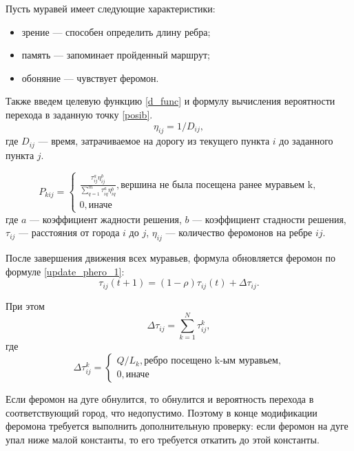 Пусть муравей имеет следующие характеристики:
\begin{itemize}[label=---]
	\item зрение --- способен определить длину ребра;
	\item память --- запоминает пройденный маршрут;
	\item обоняние --- чувствует феромон.
\end{itemize}

Также введем целевую функцию \eqref{d_func} и формулу вычисления вероятности перехода в заданную точку \eqref{posib}.
\begin{equation}
	\label{d_func}
	\eta_{ij} = 1 / D_{ij},
\end{equation}
где $D_{ij}$ — время, затрачиваемое на дорогу из текущего пункта $i$ до заданного пункта $j$.

\begin{equation}
	\label{posib}
	P_{kij} = \begin{cases}
		\frac{\tau_{ij}^a\eta_{ij}^b}{\sum_{q=1}^m \tau^a_{iq}\eta^b_{iq}}, \textrm{вершина не была посещена ранее муравьем k,} \\
		0, \textrm{иначе}
	\end{cases}
\end{equation}
где $a$ --- коэффициент жадности решения, $b$ --- коэффициент стадности решения, $\tau_{ij}$ --- расстояния от города $i$ до $j$, $\eta_{ij}$ --- количество феромонов на ребре $ij$.

После завершения движения всех муравьев, формула обновляется феромон по формуле \eqref{update_phero_1}:
\begin{equation}
	\label{update_phero_1}
	\tau_{ij}(t+1) = (1-\rho)\tau_{ij}(t) + \Delta \tau_{ij}.
\end{equation}

При этом
\begin{equation}
	\label{update_phero_2}
	\Delta \tau_{ij} = \sum_{k=1}^N \tau^k_{ij},
\end{equation}
где
\begin{equation}
	\label{update_phero_3}
	\Delta\tau^k_{ij} = \begin{cases}
		Q/L_{k}, \textrm{ребро посещено k-ым муравьем,} \\
		0, \textrm{иначе}
	\end{cases}
\end{equation}

Если феромон на дуге обнулится, то обнулится и вероятность перехода в соответствующий город, что недопустимо. Поэтому в конце модификации феромона требуется выполнить дополнительную проверку: если феромон на дуге упал ниже малой константы, то его требуется откатить до этой константы.


